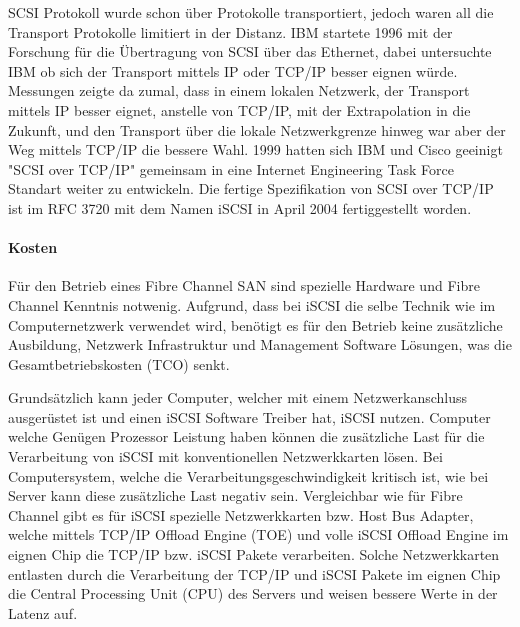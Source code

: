 SCSI Protokoll wurde schon über Protokolle transportiert, jedoch waren all die Transport Protokolle limitiert in der Distanz. IBM startete 1996 mit der Forschung für die Übertragung von SCSI über das Ethernet, dabei untersuchte IBM ob sich der Transport mittels IP oder TCP/IP besser eignen würde. Messungen zeigte da zumal, dass in einem lokalen Netzwerk, der Transport mittels IP besser eignet, anstelle von TCP/IP, mit der Extrapolation in die Zukunft, und den Transport über die lokale Netzwerkgrenze hinweg war aber der Weg mittels TCP/IP die bessere Wahl. 1999 hatten sich IBM und Cisco geeinigt "SCSI over TCP/IP" gemeinsam in eine Internet Engineering Task Force Standart weiter zu entwickeln. \cite{JohnL.202} Die fertige Spezifikation von SCSI over TCP/IP ist im RFC 3720 mit dem Namen iSCSI in April 2004 fertiggestellt worden.\cite{J.Satran2004}

\paragraph*{Kosten}
Für den Betrieb eines Fibre Channel SAN sind spezielle Hardware und Fibre Channel Kenntnis notwenig. Aufgrund, dass bei iSCSI die selbe Technik wie im Computernetzwerk verwendet wird, benötigt es für den Betrieb keine zusätzliche Ausbildung, Netzwerk Infrastruktur und Management Software Lösungen, was die Gesamtbetriebskosten (TCO) senkt.

Grundsätzlich kann jeder Computer, welcher mit einem Netzwerkanschluss ausgerüstet ist und einen iSCSI Software Treiber hat, iSCSI nutzen. Computer welche Genügen Prozessor Leistung haben können die zusätzliche Last für die Verarbeitung von iSCSI mit konventionellen Netzwerkkarten lösen. Bei Computersystem, welche die Verarbeitungsgeschwindigkeit kritisch ist, wie bei Server kann diese zusätzliche Last negativ sein. Vergleichbar wie für Fibre Channel gibt es für iSCSI spezielle Netzwerkkarten bzw. Host Bus Adapter, welche mittels TCP/IP Offload Engine (TOE) und volle iSCSI Offload Engine im eignen Chip die TCP/IP bzw. iSCSI Pakete verarbeiten. Solche Netzwerkkarten entlasten durch die Verarbeitung der TCP/IP und iSCSI Pakete im eignen Chip die Central Processing Unit (CPU) des Servers und weisen bessere Werte in der Latenz auf.

